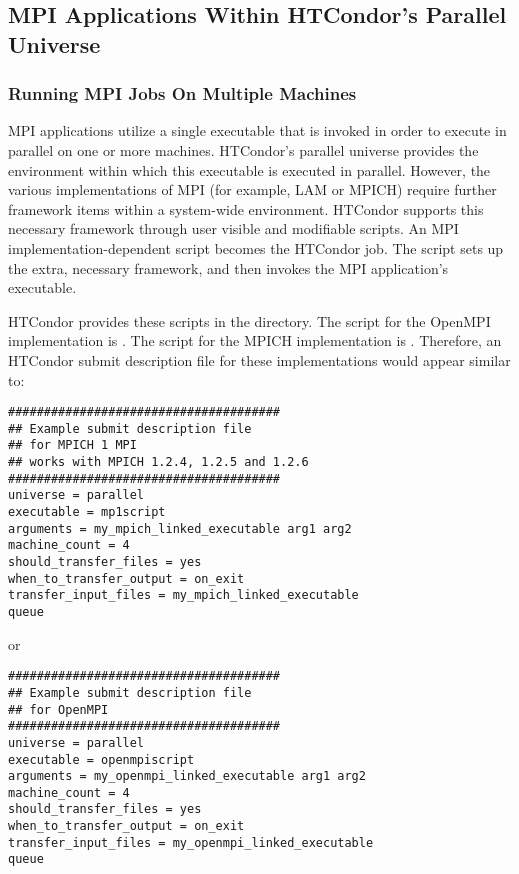 \subsection{\label{sec:parallel-mpi-submit}MPI Applications Within HTCondor's Parallel Universe}

\subsubsection{\label{sec:parallel-mpi-submit-multiple}
Running MPI Jobs On Multiple Machines}

MPI applications utilize a single executable that is invoked in order to
execute in parallel on one or more machines. 
HTCondor's parallel universe provides the environment within
which this executable is executed in parallel.
However, the various implementations of MPI
(for example, LAM or MPICH) require further framework items within
a system-wide environment.
HTCondor supports this necessary framework through 
user visible and modifiable scripts.
An MPI implementation-dependent script becomes the HTCondor job.
The script sets up the extra, necessary framework,
and then invokes the MPI application's executable.

HTCondor provides these scripts in the
directory.
The script for the OpenMPI implementation is .
The script for the MPICH implementation is .
Therefore, an HTCondor submit description file for these
implementations would appear similar to:

\begin{verbatim}
######################################
## Example submit description file
## for MPICH 1 MPI
## works with MPICH 1.2.4, 1.2.5 and 1.2.6
######################################
universe = parallel
executable = mp1script
arguments = my_mpich_linked_executable arg1 arg2
machine_count = 4
should_transfer_files = yes
when_to_transfer_output = on_exit
transfer_input_files = my_mpich_linked_executable
queue
\end{verbatim}

or

\begin{verbatim}
######################################
## Example submit description file
## for OpenMPI
######################################
universe = parallel
executable = openmpiscript
arguments = my_openmpi_linked_executable arg1 arg2
machine_count = 4
should_transfer_files = yes
when_to_transfer_output = on_exit
transfer_input_files = my_openmpi_linked_executable
queue
\end{verbatim}

